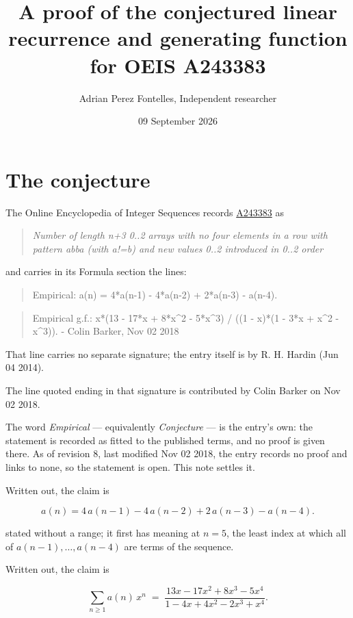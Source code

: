 \documentclass[11pt]{article}
\title{A proof of the conjectured linear recurrence and generating function for OEIS A243383}
\author{Adrian Perez Fontelles, Independent researcher}
\date{09 September 2026}
\theoremstyle{definition}
\begin{document}
\maketitle
\section{The conjecture}

The Online Encyclopedia of Integer Sequences records \href{https://oeis.org/A243383}{A243383} as

\begin{quote}\itshape Number of length n+3 0..2 arrays with no four elements in a row with pattern abba (with a!=b) and new values 0..2 introduced in 0..2 order\end{quote}

and carries in its Formula section the lines:

\begin{quote}\ttfamily Empirical: a(n) = 4*a(n-1) - 4*a(n-2) + 2*a(n-3) - a(n-4).\end{quote}

\begin{quote}\ttfamily Empirical g.f.: x*(13 - 17*x + 8*x\textasciicircum{}2 - 5*x\textasciicircum{}3) / ((1 - x)*(1 - 3*x + x\textasciicircum{}2 - x\textasciicircum{}3)). - Colin Barker, Nov 02 2018\end{quote}

That line carries no separate signature; the entry itself is by R. H. Hardin (Jun 04 2014).

The line quoted ending in that signature is contributed by Colin Barker on Nov 02 2018.

The word {\itshape Empirical} --- equivalently {\itshape Conjecture} --- is the entry's own: the statement is recorded as fitted to the published terms, and no proof is given there. As of revision 8, last modified Nov 02 2018, the entry records no proof and links to none, so the statement is open. This note settles it.

Written out, the claim is

\[a(n) = 4\,a(n-1) - 4\,a(n-2) + 2\,a(n-3) - a(n-4).\]

stated without a range; it first has meaning at $n = 5$, the least index at which all of $a(n-1),\dots,a(n-4)$ are terms of the sequence.

Written out, the claim is

\[\sum_{n \ge 1} a(n)\,x^n \;=\; \frac{13x - 17x^{2} + 8x^{3} - 5x^{4}}{1 - 4x + 4x^{2} - 2x^{3} + x^{4}}.\]
\end{document}
